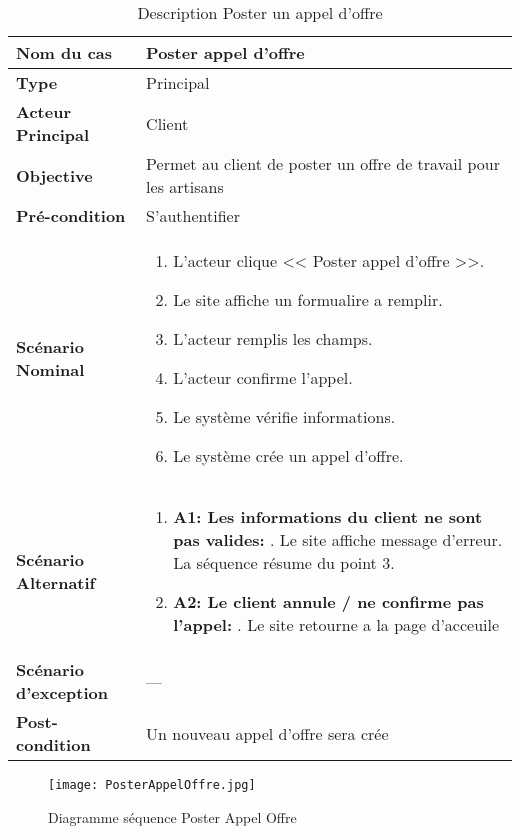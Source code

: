\begin{center}
	\begin{table}[H]
		\centering
		\tiny{\begin{tabular}{ | l | m{0.51\textheight}|}
				\hline
				\rowcolor[HTML]{06a8ed}
				\textbf{Nom du cas} & Poster appel d'offre \\
				\hline \hline
				\cellcolor[HTML]{99ccff} \textbf{Type} & Principal\\
				\hline
				\cellcolor[HTML]{99ccff} \textbf{Acteur Principal} & Client\\
				\hline
				\cellcolor[HTML]{99ccff} \textbf{Objective} & Permet au client de poster un offre de travail pour les artisans\\
				\hline
				\cellcolor[HTML]{99ccff} \textbf{Pré-condition} & S'authentifier\\
				\hline
				\cellcolor[HTML]{99ccff} \textbf{Scénario Nominal} & \parbox{0.43\textheight}{
					\begin{enumerate}
						\vspace{0.01\textheight}
						\item L'acteur clique << Poster appel d'offre >>.
						\item Le site affiche un formualire a remplir.
						\item L'acteur remplis les champs.
						\item L'acteur confirme l'appel.
						\item Le système vérifie informations.
						\item Le système crée un appel d'offre.
						\vspace{0.01\textheight}
				\end{enumerate}}\\
				\hline
				 \textbf{Scénario Alternatif} & \parbox{0.43\textheight}{
					\begin{enumerate}
						\item \textbf{A1: Les informations du client ne sont pas valides:}
							. Le site affiche message d'erreur.\newline						
						La séquence résume du point 3.
						\item \textbf{A2: Le client annule / ne confirme pas l'appel:}
							. Le site retourne a la page d'acceuile
				\end{enumerate}}\\
				\hline
				 \textbf{Scénario d'exception} & ---\\
				\hline
				 \textbf{Post-condition} & Un nouveau appel d'offre sera crée\\
				\hline
		\end{tabular}}
		\caption{Description Poster un appel d'offre}
		\label{table:post appel offre}
	\end{table}
	\begin{figure}[H]
		\centering
		\texttt{[image: PosterAppelOffre.jpg]}
		\caption{Diagramme séquence Poster Appel Offre}
		\label{fig:seq post appel offre}
	\end{figure}
\end{center}



